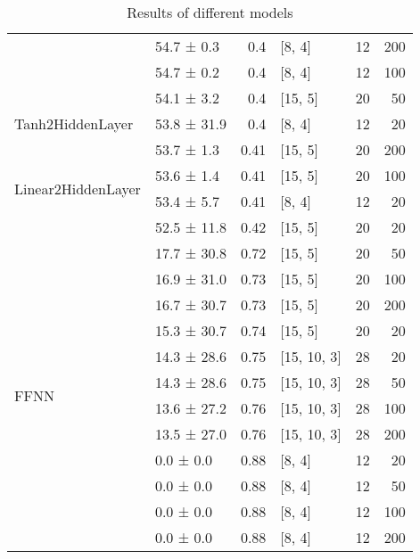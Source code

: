 \begin{table*}[h]
\begin{tabular}{llrlrr}
                                            & 54.7 ± 0.3  &  0.4  & [8, 4]         &         12 &      200 \\
                                            & 54.7 ± 0.2  &  0.4  & [8, 4]         &         12 &      100 \\
                                            & 54.1 ± 3.2  &  0.4  & [15, 5]        &         20 &       50 \\
 \hline
Tanh2HiddenLayer                    & 53.8 ± 31.9 &  0.4  & [8, 4]         &         12 &       20 \\
 \hline
\multirow{4}{*}{Linear2HiddenLayer} & 53.7 ± 1.3  &  0.41 & [15, 5]        &         20 &      200 \\
                                            & 53.6 ± 1.4  &  0.41 & [15, 5]        &         20 &      100 \\
                                            & 53.4 ± 5.7  &  0.41 & [8, 4]         &         12 &       20 \\
                                            & 52.5 ± 11.8 &  0.42 & [15, 5]        &         20 &       20 \\
 \hline
\multirow{12}{*}{FFNN}              & 17.7 ± 30.8 &  0.72 & [15, 5]        &         20 &       50 \\
                                            & 16.9 ± 31.0 &  0.73 & [15, 5]        &         20 &      100 \\
                                            & 16.7 ± 30.7 &  0.73 & [15, 5]        &         20 &      200 \\
                                            & 15.3 ± 30.7 &  0.74 & [15, 5]        &         20 &       20 \\
                                            & 14.3 ± 28.6 &  0.75 & [15, 10, 3]    &         28 &       20 \\
                                            & 14.3 ± 28.6 &  0.75 & [15, 10, 3]    &         28 &       50 \\
                                            & 13.6 ± 27.2 &  0.76 & [15, 10, 3]    &         28 &      100 \\
                                            & 13.5 ± 27.0 &  0.76 & [15, 10, 3]    &         28 &      200 \\
                                            & 0.0 ± 0.0   &  0.88 & [8, 4]         &         12 &       20 \\
                                            & 0.0 ± 0.0   &  0.88 & [8, 4]         &         12 &       50 \\
                                            & 0.0 ± 0.0   &  0.88 & [8, 4]         &         12 &      100 \\
                                            & 0.0 ± 0.0   &  0.88 & [8, 4]         &         12 &      200 \\
\hline
\end{tabular}
        \caption{Results of different models}
        \label{models}
    \end{table*}
    
